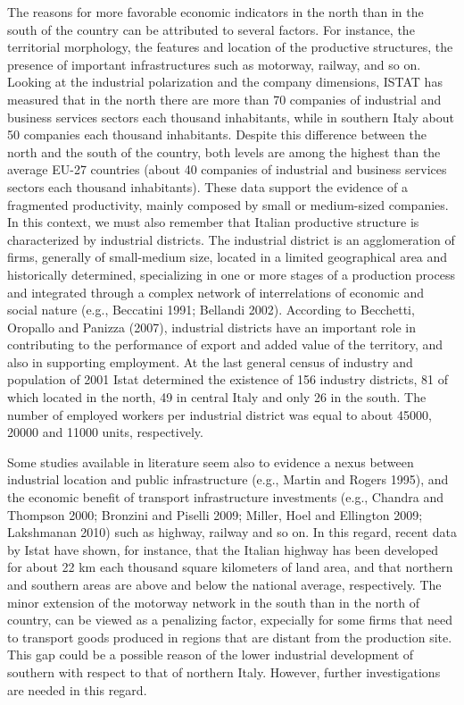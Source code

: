 \documentclass[10pt]{article}
\theoremstyle{definition}
\theoremstyle{plain}
\begin{document}
The reasons for more favorable economic indicators in the north than in the south of the country can be attributed to several factors. For instance, the territorial morphology, the features and location of the productive structures, the presence of important infrastructures such as motorway, railway, and so on. Looking at the industrial polarization and the company dimensions, ISTAT has measured that in the north there are more than 70 companies of industrial and business services sectors each thousand inhabitants, while in southern Italy about 50 companies each thousand inhabitants. Despite this difference between the north and the south of the country, both levels are among the highest than the average EU-27 countries (about 40 companies of industrial and business services sectors each thousand inhabitants). These data support the evidence of a fragmented productivity, mainly composed by small or medium-sized companies. In this context, we must also remember that Italian productive structure is characterized by industrial districts. The industrial district is an agglomeration of firms, generally of small-medium size, located in a limited geographical area and historically determined, specializing in one or more stages of a production process and integrated through a complex network of interrelations of economic and social nature (e.g., Beccatini 1991; Bellandi 2002). According to Becchetti, Oropallo and Panizza (2007), industrial districts have an important role in contributing to the performance of export and added value of the territory, and also in supporting employment. At the last general census of industry and population of 2001 Istat determined the existence of 156 industry districts, 81 of which located in the north, 49 in central Italy and only 26 in the south. The number of employed workers per industrial district was equal to about 45000, 20000 and 11000 units, respectively.  

Some studies available in literature seem also to evidence a nexus between industrial location and public infrastructure (e.g., Martin and Rogers 1995), and the economic benefit of transport infrastructure investments (e.g., Chandra and Thompson 2000; Bronzini and Piselli 2009; Miller, Hoel and Ellington 2009; Lakshmanan 2010) such as highway, railway and so on. In this regard, recent data by Istat have shown, for instance, that the Italian highway has been developed for about 22 km each thousand square kilometers of land area, and that northern and southern areas are above and below the national average, respectively. The minor extension of the motorway network in the south than in the north of country, can be viewed as a penalizing factor, expecially for some firms that need to transport goods produced in regions that are distant from the production site. This gap could be a possible reason of the lower industrial development of southern with respect to that of northern Italy. However, further investigations are needed in this regard. 
\end{document}
